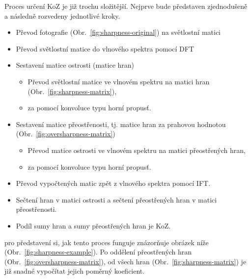 

Proces určení KoZ je již trochu složitější. Nejprve bude představen zjednodušeně a následně rozvedeny jednotlivé kroky.

\begin{itemize}
	\setlength{\parskip}{0pt}
	\setlength{\itemsep}{0pt}
	\item{Převod fotografie (Obr.~\ref{fig:sharpness-original}) na světlostní matici}
	\item{Převod světlostní matice do vlnového spektra pomocí DFT}
	\item{Sestavení matice ostrosti (matice hran)}
	\begin{itemize}
		\setlength{\parskip}{0pt}
		\setlength{\itemsep}{0pt}
		\item {Převod světlostní matice ve vlnovém spektru na matici hran (Obr.~\ref{fig:sharpness-matrix}),}
		\item {za pomocí konvoluce typu horní propusť.}
	\end{itemize}
	\item{Sestavení matice přeostřenosti, tj. matice hran za prahovou hodnotou (Obr.~\ref{fig:oversharpness-matrix})}
	\begin{itemize}
		\setlength{\parskip}{0pt}
		\setlength{\itemsep}{0pt}
		\item {Převod matice ostrosti ve vlnovém spektru na matici přeostřených hran,}
		\item {za pomocí konvoluce typu horní propusť.}
	\end{itemize}
	\item{Převod vypočtených matic zpět z vlnového spektra pomocí IFT.}
	\item{Sečtení hran v matici ostrosti a sečtení přeostřených hran v matici přeostřenosti.}
	\item{Podíl sumy hran a sumy přeostřených hran je KoZ.}
\end{itemize}

pro představení si, jak tento proces funguje znázorňuje obrázek níže (Obr.~\ref{fig:sharpness-example}). Po oddělení přeostřených hran (Obr.~\ref{fig:oversharpness-matrix}), od všech hran (Obr.~\ref{fig:sharpness-matrix}) je již snadné vypočítat jejich poměrný koeficient.

